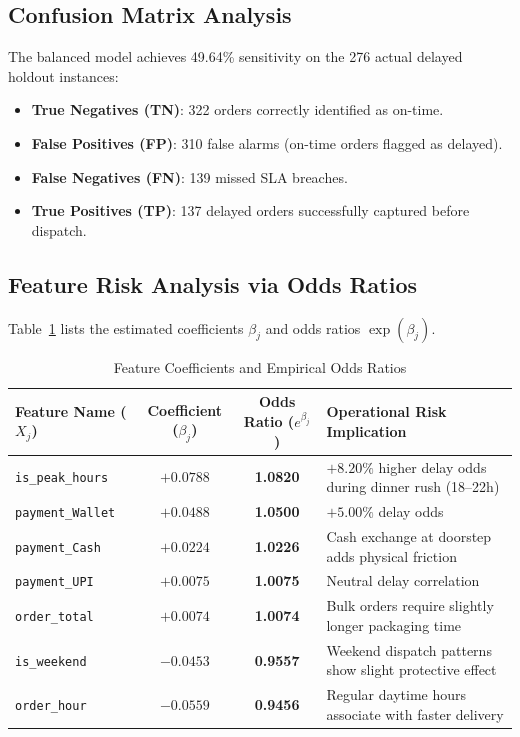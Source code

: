 \documentclass[11pt,a4paper]{article}
\begin{document}
\subsection{Confusion Matrix Analysis}
The balanced model achieves 49.64\% sensitivity on the 276 actual delayed holdout instances:
\begin{itemize}
    \item \textbf{True Negatives (TN)}: 322 orders correctly identified as on-time.
    \item \textbf{False Positives (FP)}: 310 false alarms (on-time orders flagged as delayed).
    \item \textbf{False Negatives (FN)}: 139 missed SLA breaches.
    \item \textbf{True Positives (TP)}: 137 delayed orders successfully captured before dispatch.
\end{itemize}

\subsection{Feature Risk Analysis via Odds Ratios}
Table~\ref{tab:odds} lists the estimated coefficients $\beta_j$ and odds ratios $\exp(\beta_j)$.

\begin{table}[H]
\centering
\caption{Feature Coefficients and Empirical Odds Ratios}
\label{tab:odds}
\begin{tabularx}{\linewidth}{lccl}
\toprule
\textbf{Feature Name ($X_j$)} & \textbf{Coefficient ($\beta_j$)} & \textbf{Odds Ratio ($e^{\beta_j}$)} & \textbf{Operational Risk Implication} \\
\midrule
\texttt{is\_peak\_hours}       & $+0.0788$ & \textbf{1.0820} & $+8.20\%$ higher delay odds during dinner rush (18--22h) \\
\texttt{payment\_Wallet}       & $+0.0488$ & \textbf{1.0500} & $+5.00\%$ delay odds \\
\texttt{payment\_Cash}         & $+0.0224$ & \textbf{1.0226} & Cash exchange at doorstep adds physical friction \\
\texttt{payment\_UPI}          & $+0.0075$ & \textbf{1.0075} & Neutral delay correlation \\
\texttt{order\_total}          & $+0.0074$ & \textbf{1.0074} & Bulk orders require slightly longer packaging time \\
\texttt{is\_weekend}           & $-0.0453$ & \textbf{0.9557} & Weekend dispatch patterns show slight protective effect \\
\texttt{order\_hour}           & $-0.0559$ & \textbf{0.9456} & Regular daytime hours associate with faster delivery \\
\bottomrule
\end{tabularx}
\end{table}
\end{document}
